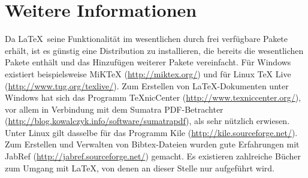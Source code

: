 \section{Weitere Informationen}
Da \LaTeX\ seine Funktionalität im wesentlichen durch frei verfügbare Pakete erhält, ist es günstig eine Distribution zu installieren, die bereits die wesentlichen Pakete enthält und das Hinzufügen weiterer Pakete vereinfacht. Für Windows existiert beispielsweise MiKTeX (\url{http://miktex.org/}) und für Linux TeX Live (\url{http://www.tug.org/texlive/}). Zum Erstellen von \LaTeX-Dokumenten unter Windows hat sich das Programm TeXnicCenter (\url{http://www.texniccenter.org/}), vor allem in Verbindung mit dem Sumatra PDF-Betrachter (\url{http://blog.kowalczyk.info/software/sumatrapdf}), als sehr nützlich erwiesen. Unter Linux gilt dasselbe für das Programm Kile (\url{http://kile.sourceforge.net/}). Zum Erstellen und Verwalten von Bibtex-Dateien wurden gute Erfahrungen mit JabRef (\url{http://jabref.sourceforge.net/}) gemacht. Es existieren zahlreiche Bücher zum Umgang mit \LaTeX, von denen an dieser Stelle nur \cite{MittelbachGoosens05} aufgeführt wird.


